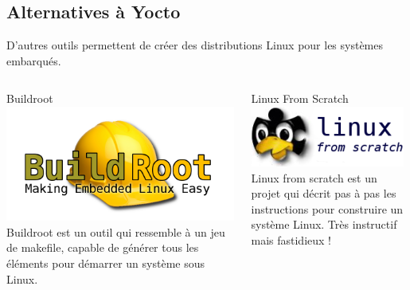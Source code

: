 \documentclass[compress]{smilebeamer}
\begin{document}
%
%
\subsection{Alternatives à Yocto}

\begin{frame}
D’autres outils permettent de créer des distributions Linux pour les systèmes embarqués.
\begin{columns}[t]
	\begin{column}{0.33\textwidth}
	\begin{exampleblock}{Buildroot}
		\includegraphics[width=\textwidth]{logos/buildroot.png}
		Buildroot est un outil qui ressemble à un jeu de makefile, capable de générer tous les éléments pour démarrer un système sous Linux.
	\end{exampleblock} 
	\end{column}
	\begin{column}{0.33\textwidth}
	\begin{exampleblock}{Linux From Scratch}
		\includegraphics[width=\textwidth]{logos/linux_from_scratch-with_text.png}
		\newline
		\newline
		Linux from scratch est un projet qui décrit pas à pas les instructions pour construire un système Linux. Très instructif mais fastidieux !
	\end{exampleblock}  

\end{column}
\end{columns}
\end{frame}
\end{document}
